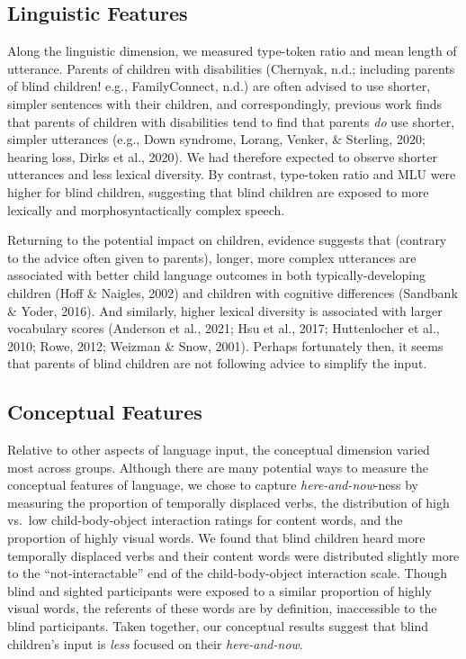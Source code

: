 \documentclass[
  man]{apa6}
\begin{document}
\hypertarget{linguistic-features-2}{%
\subsection{Linguistic Features}\label{linguistic-features-2}}

Along the linguistic dimension, we measured type-token ratio and mean length of utterance. Parents of children with disabilities (Chernyak, n.d.; including parents of blind children! e.g., FamilyConnect, n.d.) are often advised to use shorter, simpler sentences with their children, and correspondingly, previous work finds that parents of children with disabilities tend to find that parents \emph{do} use shorter, simpler utterances (e.g., Down syndrome, Lorang, Venker, \& Sterling, 2020; hearing loss, Dirks et al., 2020). We had therefore expected to observe shorter utterances and less lexical diversity. By contrast, type-token ratio and MLU were higher for blind children, suggesting that blind children are exposed to more lexically and morphosyntactically complex speech.

Returning to the potential impact on children, evidence suggests that (contrary to the advice often given to parents), longer, more complex utterances are associated with better child language outcomes in both typically-developing children (Hoff \& Naigles, 2002) and children with cognitive differences (Sandbank \& Yoder, 2016). And similarly, higher lexical diversity is associated with larger vocabulary scores (Anderson et al., 2021; Hsu et al., 2017; Huttenlocher et al., 2010; Rowe, 2012; Weizman \& Snow, 2001). Perhaps fortunately then, it seems that parents of blind children are not following advice to simplify the input.

\hypertarget{conceptual-features-2}{%
\subsection{Conceptual Features}\label{conceptual-features-2}}

Relative to other aspects of language input, the conceptual dimension varied most across groups. Although there are many potential ways to measure the conceptual features of language, we chose to capture \emph{here-and-now}-ness by measuring the proportion of temporally displaced verbs, the distribution of high vs.~low child-body-object interaction ratings for content words, and the proportion of highly visual words. We found that blind children heard more temporally displaced verbs and their content words were distributed slightly more to the ``not-interactable'' end of the child-body-object interaction scale. Though blind and sighted participants were exposed to a similar proportion of highly visual words, the referents of these words are by definition, inaccessible to the blind participants. Taken together, our conceptual results suggest that blind children's input is \emph{less} focused on their \emph{here-and-now}.
\end{document}
